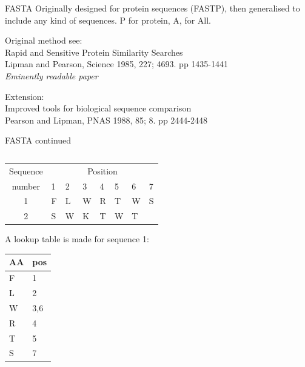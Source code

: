 \documentclass[pdf]{beamer}
\begin{document}
\begin{frame}{FASTA}
  Originally designed for protein sequences (FASTP), then generalised to
  include any kind of sequences. P for protein, A, for All.

  Original method see:\\
  Rapid and Sensitive Protein Similarity Searches\\
  Lipman and Pearson, Science 1985, 227; 4693. pp 1435-1441\\
  \emph{Eminently readable paper}

  Extension:\\
  Improved tools for biological sequence comparison\\
  Pearson and Lipman, PNAS 1988, 85; 8. pp 2444-2448 
\end{frame}
\begin{frame}[fragile]{FASTA continued}
  \begin{columns}
    \begin{column}[t]{0.5\textwidth}
      {\tiny
        \setlength{\tabcolsep}{0.5em}
      \begin{tabular}{c*{7}{l}}
        Sequence & \multicolumn{7}{c}{Position}\\
        number & 1 & 2 & 3 & 4 & 5 & 6 & 7\\
        1 & F & L & W & R & T & W & S\\
        2 & S & W & K & T & W & T & \\
      \end{tabular}
      }
      \vspace{2ex}

      \pause
      A lookup table is made for sequence 1:
      
      \vspace{2ex}
      {\tiny
        \setlength{\tabcolsep}{0.5em}
      \begin{tabular}{l|l}
        AA & pos \\
        \hline
        F & 1 \\
        L & 2 \\
        W & 3,6 \\
        R & 4 \\
        T & 5 \\
        S & 7 \\
      \end{tabular}
      }
      \pause


\end{column}
\end{columns}
\end{frame}
\end{document}

